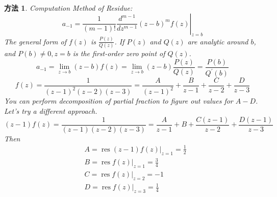 \documentclass[10pt, a4paper, oneside]{ctexbook}
\newtheorem{method}[theorem]{方法}
\begin{document}
\begin{method}
    Computation Method of Residue:
    \begin{equation*}
        a_{-1}=\left.\frac{1}{(m-1) !} \frac{d^{m-1}}{d z^{m-1}}(z-b)^{m} f(z)\right|_{z=b}
    \end{equation*}
    The general form of $f(z)$ is $\frac{P(z)}{Q(z)}$. If $P(z)$ and $Q(z)$ are analytic around $b$, and $P(b) \neq 0, z=b$ is the first-order zero point of $Q(z)$.
    $$
    a_{-1}=\lim _{z \rightarrow b}(z-b) f(z)=\lim _{z \rightarrow b}(z-b) \frac{P(z)}{Q(z)}=\frac{P(b)}{Q^{\prime}(b)}
    $$
    $$
f(z)=\frac{1}{(z-1)^{2}(z-2)(z-3)}=\frac{A}{(z-1)^{2}}+\frac{B}{z-1}+\frac{C}{z-2}+\frac{D}{z-3}
$$
You can perform decomposition of partial fraction to figure out values for $A-D$.
Let's try a different approach.
$$
(z-1) f(z)=\frac{1}{(z-1)(z-2)(z-3)}=\frac{A}{z-1}+B+\frac{C(z-1)}{z-2}+\frac{D(z-1)}{z-3}
$$
Then 
$$
\begin{aligned}
&A=\left.\operatorname{res}(z-1) f(z)\right|_{z=1}=\frac{1}{2}\\
&B=\left.\operatorname{res} f(z)\right|_{z=1}=\frac{3}{4} \\
&C=\left.\operatorname{res} f(z)\right|_{z=2}=-1 \\
&D=\left.\operatorname{res} f(z)\right|_{z=3}=\frac{1}{4}
\end{aligned}
$$
\end{method}
\end{document}
